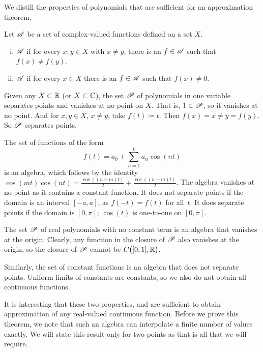 We distill the properties of polynomials that are sufficient
for an approximation theorem.

\begin{defn}
Let ${\mathscr{A}}$ be a set of complex-valued functions defined on a set $X$.
\begin{enumerate}[(i)]
\item ${\mathscr{A}}$ \emph{}
if for every $x,y \in X$ with $x \not= y$, there is an $f \in {\mathscr{A}}$ such that
$f(x) \not= f(y)$.
\item 
${\mathscr{A}}$ \emph{} if for every $x \in X$
there is an $f \in {\mathscr{A}}$ such that $f(x) \not= 0$.
\end{enumerate}
\end{defn}

\begin{example}
Given any $X \subset {\mathbb{R}}$ (or $X \subset {\mathbb{C}}$),
the set ${\mathscr{P}}$ of polynomials in one variable separates points and vanishes at no point
on $X$.  That is, $1 \in {\mathscr{P}}$, so it vanishes at no point.  And for $x,y \in
X$, $x\not= y$, take $f(t) \coloneqq t$.  Then $f(x) = x \not= y = f(y)$.
So ${\mathscr{P}}$ separates points.
\end{example}

\begin{example}
The set of functions of the form
\begin{equation*}
f(t) = a_0 + \sum_{n=1}^k a_n \cos(nt)
\end{equation*}
is an algebra,
which follows by the identity $\cos(mt)\cos(nt) = 
\frac{\cos((n+m) t)}{2}+
\frac{\cos((n-m) t)}{2}$.
The algebra vanishes at no point as it contains a constant function.
It does not separate points if the domain is an interval
$[-a,a]$, as $f(-t) = f(t)$ for all~$t$.
It does separate points if the domain is $[0,\pi]$; $\cos(t)$
is one-to-one on $[0,\pi]$.
\end{example}

\begin{example}
The set ${\mathscr{P}}$ of real polynomials with no constant term is an algebra that vanishes at the origin.
Clearly, any function in the closure of ${\mathscr{P}}$ also vanishes at the origin,
so the closure of ${\mathscr{P}}$ cannot be $C\bigl([0,1],{\mathbb{R}}\bigr)$.

Similarly, the set of constant functions is an algebra that does not
separate points.  Uniform limits of constants are constants, so we also do
not obtain all continuous functions.
\end{example}

It is interesting that these two properties,
 and
 are sufficient to obtain approximation of any
real-valued continuous function.
Before we prove this theorem, we note that such an algebra can interpolate
a finite number of values exactly.  We will state this result
only for two points as that is all that we will require.

